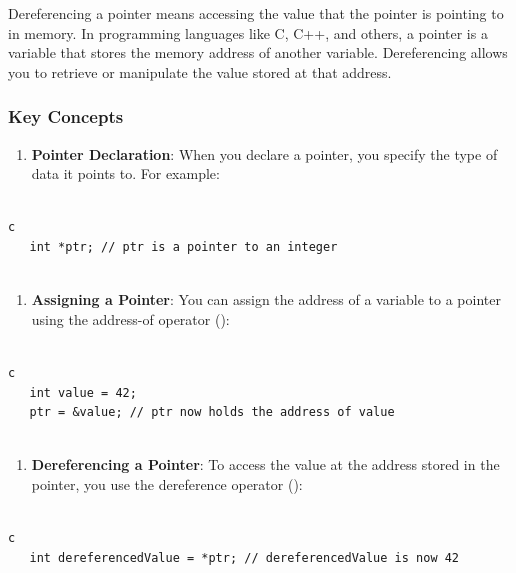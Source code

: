 \begin{botresponse}

Dereferencing a pointer means accessing the value that the pointer is pointing to in memory. In programming languages like C, C++, and others, a pointer is a variable that stores the memory address of another variable. Dereferencing allows you to retrieve or manipulate the value stored at that address.

\subsubsection{Key Concepts}

\begin{enumerate}
\item \textbf{Pointer Declaration}: When you declare a pointer, you specify the type of data it points to. For example:
\end{enumerate}

\begin{lstlisting}[breaklines=true, breakatwhitespace=false]

c
   int *ptr; // ptr is a pointer to an integer
   

\end{lstlisting}

\begin{enumerate}
\item \textbf{Assigning a Pointer}: You can assign the address of a variable to a pointer using the address-of operator (\seqsplit{\&}):
\end{enumerate}

\begin{lstlisting}[breaklines=true, breakatwhitespace=false]

c
   int value = 42;
   ptr = &value; // ptr now holds the address of value
   

\end{lstlisting}

\begin{enumerate}
\item \textbf{Dereferencing a Pointer}: To access the value at the address stored in the pointer, you use the dereference operator (\seqsplit{*}):
\end{enumerate}

\begin{lstlisting}[breaklines=true, breakatwhitespace=false]

c
   int dereferencedValue = *ptr; // dereferencedValue is now 42
   


\end{lstlisting}
\end{botresponse}
